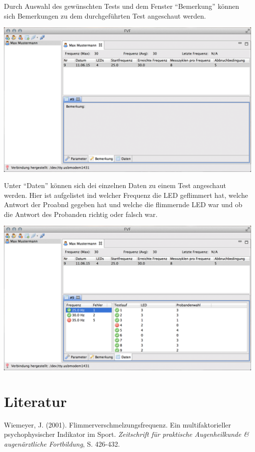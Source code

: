 \documentclass[11pt,accentcolor=tud2a,colorback,noheadingspace,bigchapter]{tudreport}
\begin{document}
Durch Auswahl des gewünschten Tests und dem Fenster ``Bemerkung'' können sich Bemerkungen zu dem durchgeführten Test angeschaut werden.

\includegraphics[width=\textwidth]{results_notes.png}

Unter ``Daten'' können sich dei einzelnen Daten zu einem Test angeschaut werden. Hier ist aufgelistet ind welcher Frequenz die LED geflimmert hat, welche Antwort der Proabnd gegeben hat und welche die flimmernde LED war und ob die Antwort des Probanden richtig oder falsch war.

\includegraphics[width=\textwidth]{results_runs.png}


\chapter{Literatur}
\label{references::doc}\label{references:literatur}
Wiemeyer, J. (2001). Flimmerverschmelzungsfrequenz. Ein multifaktorieller psychophysischer Indikator im Sport. \emph{Zeitschrift für praktische Augenheilkunde \& augenärztliche Fortbildung}, S. 426-432.
\end{document}
